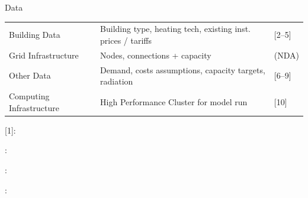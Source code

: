 \documentclass[10pt, aspectration=169]{beamer}
\begin{document}
\begin{frame}{Data}
{\begin{tabular}{|l l l|}
    Building Data 
        & Building type, heating tech, existing inst.  prices / tariffs
        & [2--5] \\
                
    Grid Infrastructure 
        & Nodes, connections + capacity
        & (NDA) \\
        
    Other Data
        & Demand, costs assumptions, capacity targets, radiation
        & [6--9] \\
        
    Computing Infrastructure
        & High Performance Cluster for model run
        & [10] \\
    \hline
\end{tabular}

\vspace{0.2cm}
}

\vspace{0.2cm}
{\tiny
\begin{minipage}{\linewidth}
\raggedright
[1]: \cite{solkat2023}\par
[2--5]: \cite{gwr2025, elec_prod2024, vese_pvtarif2023, elcom2023}\par
[6--9]: \cite{swissstore2022,  energieschweiz2023, bfe_ep2050_2020, meteoblue2023}\par
[10]: \cite{hpc_scicore2026}\par
\end{minipage}

}\end{frame}

\end{document}
